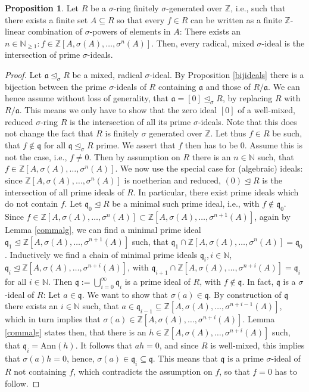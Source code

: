 \documentclass{article}
\def\NE{\mathbb{N}_{\geq1}}
\def\N{\mathbb{N}}
\def\Z{\mathbb{Z}}
\def\a{\mathfrak{a}}
\def\q{\mathfrak{q}}
\def\s{\sigma}
\def\si{\unlhd_{\sigma}}
\def\fa{\text{ for all }}
\newenvironment{bew}{\begin{proof}[Proof]}{\end{proof}}
\theoremstyle{definition}
\newtheorem{prop}[Satz]{Proposition}
\begin{document}
\begin{prop}\label{mixedintersectionprimesfinite}
Let $R$ be a $\s$-ring finitely $\s$-generated over $\Z$, i.e., such that there exists a finite set $A \subseteq R$ so that every $f \in R$ can be written as a finite $\Z$-linear combination of $\s$-powers of elements in $A$: 
There exists an $n \in \NE: f \in \Z[A,\sigma(A),\ldots,\s^n(A)]$. Then, every radical, mixed $\s$-ideal is the intersection of prime $\s$-ideals.
\begin{bew}
Let $\a \si R$ be a mixed, radical $\s$-ideal. By Proposition \ref{bijideals} there is a bijection between the prime $\s$-ideals of $R$ containing $\a$ and those of $R/\a$. We can hence assume without loss of generality, that $\a = [0] \si R$,
 by replacing $R$ with $R/\a$. This means we only have to show that the zero ideal $[0]$ of a well-mixed, reduced $\s$-ring $R$ is the intersection of all its prime $\s$-ideals. Note that this does not change the fact
that $R$ is finitely $\s$ generated over $\Z$. Let thus $f \in R$ be such, 
that $f \notin \q \fa \q \si R$ prime. We assert that $f$ then has to be $0$. Assume this is not the case, i.e., $f \neq 0$. Then by assumption on $R$ there is an $n \in \N$ such, that $f \in \Z[A,\s(A),\ldots,\s^n(A)]$.
We now use the special case for (algebraic) ideals: since $\Z[A,\s(A),\ldots,\s^n(A)]$ is noetherian and reduced, $(0) \unlhd R$ is the intersection of all prime ideals of $R$. In particular, there exist prime ideals which do not contain $f$.
Let $\q_0 \unlhd R$ be a minimal such prime ideal, i.e., with $f \notin \q_0$. Since $f \in \Z[A,\s(A),\ldots,\s^n(A)] \subset \Z[A,\s(A),\ldots,\s^{n+1}(A)]$, again by Lemma \ref{commalg}, we can find a minimal prime ideal $\q_1 \unlhd \Z[A,\s(A),\ldots,\s^{n+1}(A)]$
such, that $\q_1 \cap \Z[A,\s(A),\ldots,\s^{n}(A)] = \q_0$. Inductively we find a chain of minimal prime ideals $\q_i, i \in \N$, $\q_i \unlhd \Z[A,\s(A),\ldots,\s^{n+i}(A)]$, with $\q_{i+1} \cap \Z[A,\s(A),\ldots,\s^{n+i}(A)] = \q_i$ for all $i \in \N$.
Then $\q := \bigcup_{i=0}^{\infty} \q_i$ is a prime ideal of $R$, with $f \notin \q$. In fact, $\q$ is a $\s$-ideal of $R$: Let $a \in \q$. We want to show that $\s(a) \in \q$. By construction of $\q$ there exists an $i \in \N$ such,
that $a \in \q_{i-1} \subseteq \Z[A,\s(A),\ldots,\s^{n+i-1}(A)]$, which in turn implies that $\s(a) \in \Z[A,\s(A),\ldots,\s^{n+i}(A)]$. Lemma \ref{commalg} states then, that there is an $h \in \Z[A,\s(A),\ldots,\s^{n+i}(A)]$ such, that $ \q_i = \text{Ann}(h)$.
It follows that $ah = 0$, and since $R$ is well-mixed, this implies that $\s(a)h = 0$, hence, $\s(a) \in \q_i \subseteq \q$. This means that $\q$ is a prime $\s$-ideal of $R$ not containing $f$, which contradicts the assumption on $f$, so that $f = 0$ has to follow.
\end{bew}
\end{prop}
\end{document}
